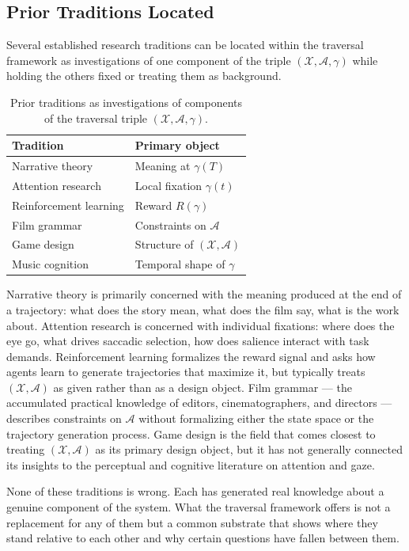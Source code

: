 \documentclass[12pt, a4paper]{article}
\theoremstyle{plain}
\theoremstyle{definition}
\theoremstyle{remark}
\newcommand{\X}{\mathcal{X}}
\newcommand{\A}{\mathcal{A}}
\newcommand{\traj}{\gamma}
\newcommand{\reward}{R}
\begin{document}
\subsection{Prior Traditions Located}
\label{subsec:traditions}

Several established research traditions can be located within
the traversal framework as investigations of one component of
the triple $(\X, \A, \traj)$ while holding the others fixed
or treating them as background.

\begin{table}[h]
\centering
\begin{tabular}{ll}
\toprule
\textbf{Tradition} & \textbf{Primary object} \\
\midrule
Narrative theory        & Meaning at $\traj(T)$ \\
Attention research      & Local fixation $\traj(t)$ \\
Reinforcement learning  & Reward $\reward(\traj)$ \\
Film grammar            & Constraints on $\A$ \\
Game design             & Structure of $(\X, \A)$ \\
Music cognition         & Temporal shape of $\traj$ \\
\bottomrule
\end{tabular}
\caption{Prior traditions as investigations of components
  of the traversal triple $(\X, \A, \traj)$.}
\label{tab:traditions}
\end{table}

Narrative theory is primarily concerned with the meaning
produced at the end of a trajectory: what does the story
mean, what does the film say, what is the work about.
Attention research is concerned with individual fixations:
where does the eye go, what drives saccadic selection, how
does salience interact with task demands. Reinforcement
learning formalizes the reward signal and asks how agents
learn to generate trajectories that maximize it, but
typically treats $(\X, \A)$ as given rather than as a design
object. Film grammar --- the accumulated practical knowledge
of editors, cinematographers, and directors --- describes
constraints on $\A$ without formalizing either the state
space or the trajectory generation process. Game design is
the field that comes closest to treating $(\X, \A)$ as its
primary design object, but it has not generally connected its
insights to the perceptual and cognitive literature on
attention and gaze.

None of these traditions is wrong. Each has generated real
knowledge about a genuine component of the system. What the
traversal framework offers is not a replacement for any of
them but a common substrate that shows where they stand
relative to each other and why certain questions have fallen
between them.
\end{document}

